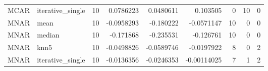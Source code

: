 \begin{table}[ht]
\begin{tabular}{llrrrrrrr}
 MCAR        & iterative\_single &           10 &                            0.0786223  &             0.0480611 &             0.103505   &                         0 &                       10 &                                0 \\
 MNAR        & mean             &           10 &                           -0.0958293  &            -0.180222  &            -0.0571147  &                        10 &                        0 &                                0 \\
 MNAR        & median           &           10 &                           -0.171868   &            -0.235531  &            -0.126761   &                        10 &                        0 &                                0 \\
 MNAR        & knn5             &           10 &                           -0.0498826  &            -0.0589746 &            -0.0197922  &                         8 &                        0 &                                2 \\
 MNAR        & iterative\_single &           10 &                           -0.0136356  &            -0.0246353 &            -0.00114025 &                         7 &                        1 &                                2 \\
\hline
\end{tabular}
\end{table}
